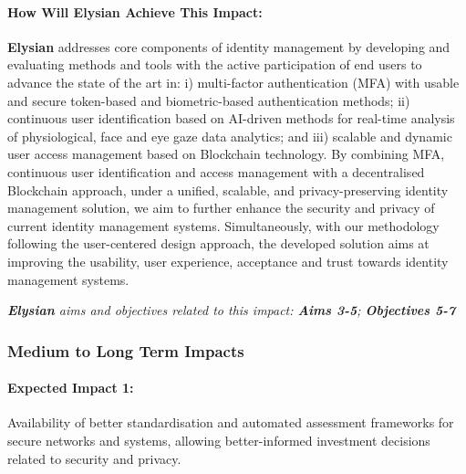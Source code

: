 \documentclass[a4paper,11pt]{article}
\newcommand{\project}[1]{\textbf{#1}\xspace}
\newcommand{\SECURITY}{\project{Elysian}}
\newcommand{\TheProject}{\SECURITY}
\begin{document}
\begin{mdframed}[backgroundcolor=gray!10]
\paragraph{How Will \TheProject{} Achieve This Impact:} %
\TheProject{} addresses core components of identity management by developing and evaluating methods and tools with the active participation of end users to advance the state of the art in: i) multi-factor authentication (MFA) with usable and secure token-based and biometric-based authentication methods; ii) continuous user identification based on AI-driven methods for real-time analysis of physiological, face and eye gaze data analytics; and iii) scalable and dynamic user access management based on Blockchain technology.  
By combining MFA, continuous user identification and access management with a decentralised Blockchain approach, under a unified, scalable, and privacy-preserving identity management solution, we aim to further enhance the security and privacy of current identity management systems. Simultaneously, with our methodology following the user-centered design approach, the developed solution aims at improving the usability, user experience, acceptance and trust towards identity management systems.

\emph{\TheProject{} aims and objectives related to this impact: \textbf{Aims 3-5}; \textbf{Objectives 5-7} }
\end{mdframed}

\pagebreak
\subsubsection{Medium to Long Term Impacts}

\begin{mdframed}[backgroundcolor=blue!5]
\paragraph{Expected Impact 1:}
Availability of better standardisation and automated assessment frameworks for secure networks and systems, allowing better-informed investment decisions related to security and privacy.
\end{mdframed}
\end{document}

